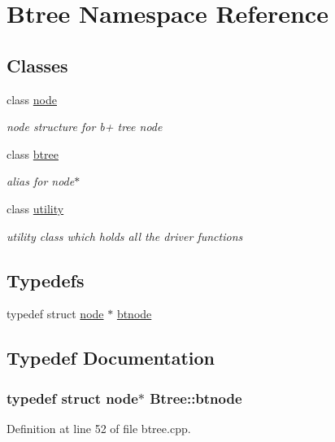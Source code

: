 \hypertarget{namespace_btree}{\section{Btree Namespace Reference}
\label{namespace_btree}
}
\subsection*{Classes}
\begin{DoxyCompactItemize}
\item 
class \hyperlink{class_btree_1_1node}{node}
\begin{DoxyCompactList}\small\item\em node structure for b+ tree node \end{DoxyCompactList}\item 
class \hyperlink{class_btree_1_1btree}{btree}
\begin{DoxyCompactList}\small\item\em alias for node$\ast$ \end{DoxyCompactList}\item 
class \hyperlink{class_btree_1_1utility}{utility}
\begin{DoxyCompactList}\small\item\em utility class which holds all the driver functions \end{DoxyCompactList}\end{DoxyCompactItemize}
\subsection*{Typedefs}
\begin{DoxyCompactItemize}
\item 
typedef struct \hyperlink{class_btree_1_1node}{node} $\ast$ \hyperlink{namespace_btree_af2177a710b4e16aaf0c14dcbbc01a9af}{btnode}
\end{DoxyCompactItemize}


\subsection{Typedef Documentation}
\hypertarget{namespace_btree_af2177a710b4e16aaf0c14dcbbc01a9af}{
\subsubsection[{btnode}]{\setlength{\rightskip}{0pt plus 5cm}typedef struct {\bf node}$\ast$ {\bf Btree\-::btnode}}}\label{namespace_btree_af2177a710b4e16aaf0c14dcbbc01a9af}


Definition at line 52 of file btree.\-cpp.

